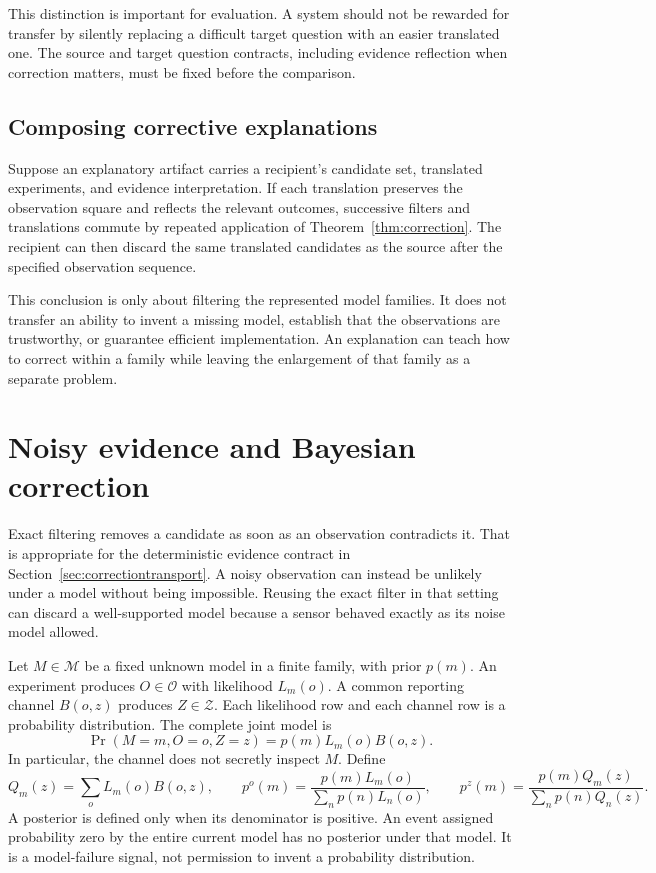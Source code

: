 \documentclass[11pt,letterpaper]{article}
\theoremstyle{plain}
\theoremstyle{definition}
\newcommand{\M}{\mathcal M}\newcommand{\E}{\mathbb E}
\begin{document}
This distinction is important for evaluation. A system should not be rewarded for transfer by silently replacing a difficult target question with an easier translated one. The source and target question contracts, including evidence reflection when correction matters, must be fixed before the comparison.

\subsection{Composing corrective explanations}
Suppose an explanatory artifact carries a recipient's candidate set, translated experiments, and evidence interpretation. If each translation preserves the observation square and reflects the relevant outcomes, successive filters and translations commute by repeated application of Theorem~\ref{thm:correction}. The recipient can then discard the same translated candidates as the source after the specified observation sequence.

This conclusion is only about filtering the represented model families. It does not transfer an ability to invent a missing model, establish that the observations are trustworthy, or guarantee efficient implementation. An explanation can teach how to correct within a family while leaving the enlargement of that family as a separate problem.

\section{Noisy evidence and Bayesian correction}\label{sec:bayesian}
Exact filtering removes a candidate as soon as an observation contradicts it. That is appropriate for the deterministic evidence contract in Section~\ref{sec:correctiontransport}. A noisy observation can instead be unlikely under a model without being impossible. Reusing the exact filter in that setting can discard a well-supported model because a sensor behaved exactly as its noise model allowed.

Let $M\in\M$ be a fixed unknown model in a finite family, with prior $p(m)$. An experiment produces $O\in\mathcal O$ with likelihood $L_m(o)$. A common reporting channel $B(o,z)$ produces $Z\in\mathcal Z$. Each likelihood row and each channel row is a probability distribution. The complete joint model is
\begin{equation}\label{eq:bayes-joint}
\Pr(M=m,O=o,Z=z)=p(m)L_m(o)B(o,z).
\end{equation}
In particular, the channel does not secretly inspect $M$. Define
\[
Q_m(z)=\sum_o L_m(o)B(o,z),\qquad
p^o(m)=\frac{p(m)L_m(o)}{\sum_n p(n)L_n(o)},\qquad
p^z(m)=\frac{p(m)Q_m(z)}{\sum_n p(n)Q_n(z)}.
\]
A posterior is defined only when its denominator is positive. An event assigned probability zero by the entire current model has no posterior under that model. It is a model-failure signal, not permission to invent a probability distribution.
\end{document}
